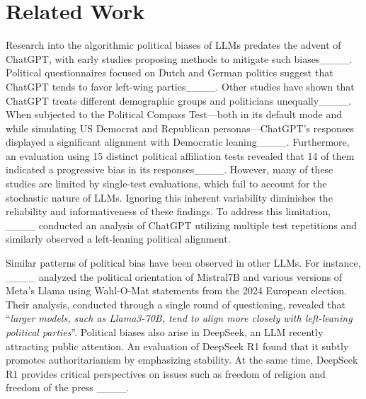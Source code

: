 \section{Related Work}
Research into the algorithmic political biases of LLMs predates the advent of ChatGPT, with early studies proposing methods to mitigate such biases____.
Political questionnaires focused on Dutch and German politics suggest that ChatGPT tends to favor left-wing parties____.
Other studies have shown that ChatGPT treats different demographic groups and politicians unequally____.
When subjected to the Political Compass Test---both in its default mode and while simulating US Democrat and Republican personas---ChatGPT's responses displayed a significant alignment with Democratic leaning____.
Furthermore, an evaluation using 15 distinct political affiliation tests revealed that 14 of them indicated a progressive bias in its responses____.
However, many of these studies are limited by single-test evaluations, which fail to account for the stochastic nature of LLMs.
Ignoring this inherent variability diminishes the reliability and informativeness of these findings.
To address this limitation, ____ conducted an analysis of ChatGPT utilizing multiple test repetitions and similarly observed a left-leaning political alignment.


Similar patterns of political bias have been observed in other LLMs.
For instance, ____ analyzed the political orientation of Mistral7B and various versions of Meta's Llama using Wahl-O-Mat statements from the 2024 European election.
Their analysis, conducted through a single round of questioning, revealed that \enquote{\itshape larger models, such as Llama3-70B, tend to align more closely with left-leaning political parties}.
Political biases also arise in DeepSeek, an LLM recently attracting public attention.
An evaluation of DeepSeek R1 found that it subtly promotes authoritarianism by emphasizing stability.
At the same time, DeepSeek R1 provides critical perspectives on issues such as freedom of religion and freedom of the press ____.


